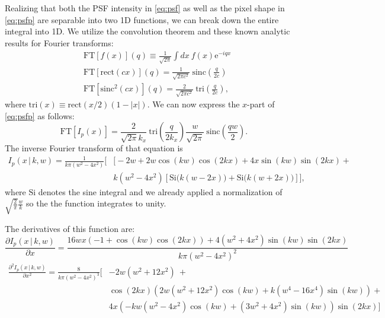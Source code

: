 \documentclass[modern, times]{aastex61}
\begin{document}
Realizing that both the PSF intensity in \autoref{eq:psf} as well as the pixel shape in \autoref{eq:psfp}  are separable into two 1D functions, we can break down the entire integral into 1D.
We utilize the convolution theorem and these known analytic results for Fourier transforms:
\begin{align}
&\mathrm{FT}\left[f(x)\right](q) \equiv \frac{1}{\sqrt{2\pi}}\int dx\ f(x) \mathrm{e}^{-iqx}\\
&\mathrm{FT}\left[\text{rect}(cx)\right](q) = \frac{1}{\sqrt{2\pi c^2}}\ \text{sinc}\left(\frac{q}{2 c}\right)\\
&\mathrm{FT}\left[\text{sinc}^2(cx)\right](q) = \frac{2}{\sqrt{2\pi c^2}}\ \text{tri}\left(\frac{q}{2 c}\right),
\end{align} 
where $\text{tri}(x)\equiv\text{rect}(x/2)(1-|x|)$. 
We can now express the $x$-part of \autoref{eq:psfp} as follows:
\begin{equation}
\mathrm{FT}\left[I_p(x)\right] = \frac{2}{\sqrt{2\pi} k_x}\ \text{tri}\left(\frac{q}{2 k_x}\right) \frac{w}{\sqrt{2\pi}}\ \text{sinc}\left(\frac{q w}{2}\right).
\end{equation}
The inverse Fourier transform of that equation is
\begin{equation}
\label{eq:psf1d}
\begin{split}
I_p(x\,|\,k,w) =  \frac{1}{k \pi (w^2 - 4x^2)}\Big[&
\big[-2w+2w\cos(kw)\cos(2 kx) + 4 x \sin(kw) \sin(2 kx) +\\
&k(w^2-4 x^2) \left[\text{Si}\big(k(w-2 x)\big) + \text{Si}\big(k(w+2 x)\big) \right]
\Big],
\end{split}
\end{equation}
where $\text{Si}$ denotes the sine integral and we already applied a normalization of $\sqrt{\tfrac{2}{\pi}}\frac{w}{k}$ so the the function integrates to unity.

The derivatives of this function are:
\begin{equation}
\label{eq:dpsf1d}
\frac{\partial I_p(x\,|\,k,w)}{\partial x} = 
\frac{16 w  x \left(-1 +\cos(kw)\cos(2kx)\right) + 4 (w^2+4 x^2) \sin(k w) \sin(2kx)}{k \pi \left(w^2-4 x^2\right)^2}
\end{equation}
\begin{equation}
\begin{split}
\frac{\partial^2 I_p(x\,|\,k,w)}{\partial x^2} = \frac{8}{k \pi \left(w^2-4 x^2\right)^3}
\Big[&-2w (w^2+12x^2)\ +\\
&\cos(2 k x)\left(2w (w^2+12x^2)\cos(k w) + k(w^4-16x^4)\sin(k w)\right) +\\
&4x\left(-kw (w^2-4x^2)\cos(k w)+(3w^2+4x^2)\sin(k w)\right)\sin(2k x)\Big]
\end{split}
\end{equation}
\end{document}
